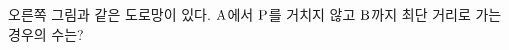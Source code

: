 \noindent\begin{minipage}[t]{0.58\linewidth}\vspace{0pt}\raggedright 오른쪽 그림과 같은 도로망이 있다. $\mathrm{A}$에서 $\mathrm{P}$를 거치지 않고 $\mathrm{B}$까지 최단 거리로 가는 경우의 수는?\end{minipage}\hfill\begin{minipage}[t]{0.4\linewidth}\vspace{0pt}\centering \resizebox{\ifdim\width>\linewidth\linewidth\else\width\fi}{!}{}\end{minipage}\par
{}
